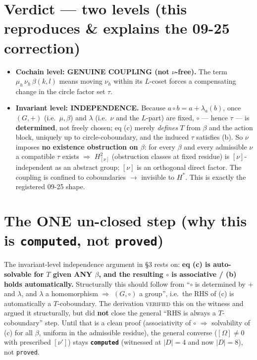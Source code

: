 \documentclass[11pt]{article}
\newcommand{\nubr}{[\nu]}
\newcommand{\Om}{[\Omega]}
\begin{document}
\section{Verdict --- two levels (this reproduces \& explains the 09-25 correction)}
\begin{itemize}
  \item \textbf{Cochain level: GENUINE COUPLING (not $\nu$-free).} The term $\mu_h\,\nu_h\,\beta(k,l)$
    means moving $\nu_h$ within its $L$-coset forces a compensating change in the circle factor
    set $\tau$.
  \item \textbf{Invariant level: INDEPENDENCE.} Because $a\circ b=a+\lambda_a(b)$, once $(G,+)$
    (i.e.\ $\mu,\beta$) and $\lambda$ (i.e.\ $\nu$ and the $L$-part) are fixed, $\circ$ --- hence
    $\tau$ --- is \textbf{determined}, not freely chosen; eq (c) merely \emph{defines} $T$ from
    $\beta$ and the action block, uniquely up to circle-coboundary, and the induced $\tau$
    satisfies (b). So $\nu$ imposes \textbf{no existence obstruction on $\beta$}: for every
    $\beta$ and every admissible $\nu$ a compatible $\tau$ exists $\Rightarrow$ $H^2_{\nubr}$
    (obstruction classes at fixed residue) is $\nubr$-independent as an abstract group; $\nubr$
    is an orthogonal direct factor. The coupling is confined to coboundaries $\to$ invisible to
    $H^{*}$. This is exactly the registered 09-25 shape.
\end{itemize}

\section{The ONE un-closed step (why this is \texttt{computed}, not \texttt{proved})}
The invariant-level independence argument in \S3 rests on: \textbf{eq (c) is auto-solvable for
$T$ given ANY $\beta$, and the resulting $\circ$ is associative / (b) holds automatically.}
Structurally this should follow from ``$\circ$ is determined by $+$ and $\lambda$, and $\lambda$
a homomorphism $\Rightarrow$ $(G,\circ)$ a group'', i.e.\ the RHS of (c) is automatically a
$T$-coboundary. The derivation \textsc{verified} this on the witness and argued it structurally,
but did \textbf{not} close the general ``RHS is always a $T$-coboundary'' step. Until that is a
clean proof (associativity of $\circ$ $\Rightarrow$ solvability of (c) for all $\beta$, uniform
in the admissible residue), the general converse ($\Om\neq 0$ with prescribed $[\nu']$) stays
\textbf{\texttt{computed}} (witnessed at $|D|=4$ and now $|D|=8$), not \texttt{proved}.
\end{document}

